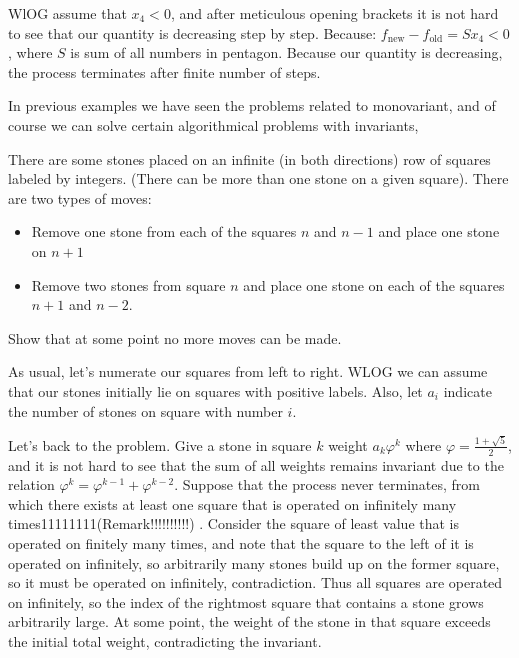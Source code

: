 WlOG assume that $x_4<0$, and after meticulous opening brackets it is not hard to see that our quantity is decreasing step by step. Because: $f_{\text{new}}-f_{\text{old}}=Sx_4<0$, where $S$ is sum of all numbers in pentagon. Because our quantity is decreasing, the process terminates after finite number of steps.

In previous examples we have seen the problems related to monovariant, and of course we can solve certain algorithmical problems with invariants,

\begin{example}
    There are some stones placed on an infinite (in both directions) row of squares labeled by integers. (There can be more than one stone on a given square). There are two types of moves:
    \begin{itemize}
        \item Remove one stone from each of the squares $n$ and $n-1$ and place one stone on $n+1$
        \item Remove two stones from square $n$ and place one stone on each of the squares $n+1$ and $n-2$.
    \end{itemize}
    Show that at some point no more moves can be made.
\end{example}

\sol
As usual, let's numerate our squares from left to right. WLOG we can assume that our stones initially lie on squares with positive labels. Also, let $a_i$ indicate the number of stones on square with number $i$.

Let's back to the problem. Give a stone in square $k$ weight $a_k\varphi^k$ where $\varphi=\frac{1+\sqrt{5}}{2}$, and it is not hard to see that the sum of all weights remains invariant due to the relation $\varphi^k = \varphi^{k-1} + \varphi^{k-2}$. Suppose that the process never terminates, from which there exists at least one square that is operated on infinitely many times11111111(Remark!!!!!!!!!!) . Consider the square of least value that is operated on finitely many times, and note that the square to the left of it is operated on infinitely, so arbitrarily many stones build up on the former square, so it must be operated on infinitely, contradiction. Thus all squares are operated on infinitely, so the index of the rightmost square that contains a stone grows arbitrarily large. At some point, the weight of the stone in that square exceeds the initial total weight, contradicting the invariant.

\begin{example}

\end{example}

